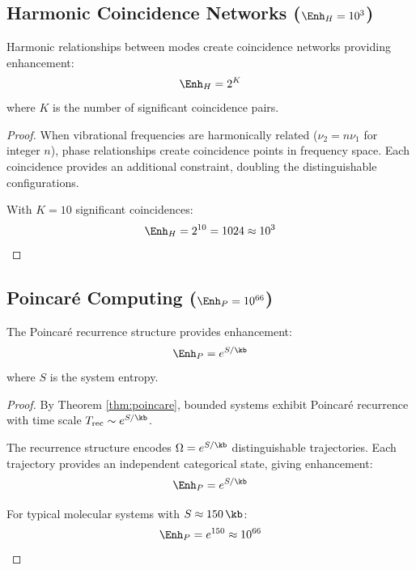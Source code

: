 \subsection{Harmonic Coincidence Networks ($\Enh_H = 10^{3}$)}

\begin{theorem}
\label{thm:harmonic}
Harmonic relationships between modes create coincidence networks providing enhancement:
\begin{equation}
\Enh_H = 2^K
\end{equation}
where $K$ is the number of significant coincidence pairs.
\end{theorem}

\begin{proof}
When vibrational frequencies are harmonically related ($\nu_2 = n \nu_1$ for integer $n$), phase relationships create coincidence points in frequency space. Each coincidence provides an additional constraint, doubling the distinguishable configurations.

With $K = 10$ significant coincidences:
\begin{equation}
\Enh_H = 2^{10} = 1024 \approx 10^3
\end{equation}
\end{proof}

\subsection{Poincar\'{e} Computing ($\Enh_P = 10^{66}$)}

\begin{theorem}
\label{thm:poincare_enhancement}
The Poincar\'{e} recurrence structure provides enhancement:
\begin{equation}
\Enh_P = e^{S/\kb}
\end{equation}
where $S$ is the system entropy.
\end{theorem}

\begin{proof}
By Theorem \ref{thm:poincare}, bounded systems exhibit Poincar\'{e} recurrence with time scale $T_{\text{rec}} \sim e^{S/\kb}$.

The recurrence structure encodes $\Omega = e^{S/\kb}$ distinguishable trajectories. Each trajectory provides an independent categorical state, giving enhancement:
\begin{equation}
\Enh_P = e^{S/\kb}
\end{equation}

For typical molecular systems with $S \approx 150 \, \kb$:
\begin{equation}
\Enh_P = e^{150} \approx 10^{66}
\end{equation}
\end{proof}

